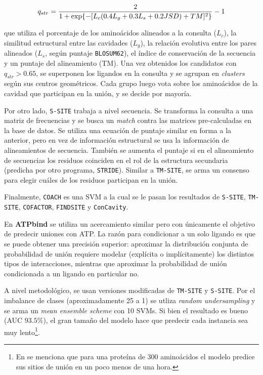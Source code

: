 \documentclass[
    left=2.0cm,         %
    right=2.0cm,        %
    top=2.0cm,          %
    bottom=2.5cm,         %
    bindingoffset=6mm,  %
    nohyphenation=false %
]{eiti/eiti-thesis}
\begin{document}
\begin{equation*}
    \LARGE 
    q_{str} = \frac{2}{1+\exp\{-[L_c(0.4L_g+0.3L_s+0.2JSD)+TM]^2\}} - 1
\end{equation*}

que utiliza el porcentaje de los aminoácidos alineados a la consulta ($L_c$),
la similitud estructural entre las cavidades ($L_g$), la relación evolutiva entre
los pares alineados ($L_s$, según puntaje \texttt{BLOSUM62}), el índice de conservación
de la secuencia y un puntaje del alineamiento (TM). Una vez obtenidos los candidatos
con $q_{str} > 0.65$, se superponen los ligandos en la consulta y se agrupan en
\textit{clusters} según sus centros geométricos. Cada grupo luego vota sobre los
aminoácidos de la cavidad que participan en la unión, y se decide por mayoría.

Por otro lado, \texttt{S-SITE} trabaja a nivel secuencia. Se transforma la consulta
a una matriz de frecuencias y se busca un \textit{match} contra las matrices pre-calculadas
en la base de datos. Se utiliza una ecuación de puntaje similar en forma a la anterior,
pero en vez de información estructural se usa la información de alineamientos de secuencia.
También se aumenta el puntaje si en el alineamiento de secuencias los residuos coinciden
en el rol de la estructura secundaria (predicha por otro programa, \texttt{STRIDE}). Similar
a \texttt{TM-SITE}, se arma un consenso para elegir cuáles de los residuos participan
en la unión.

Finalmente, \texttt{COACH} es una SVM a la cual se le pasan los resultados de \texttt{S-SITE},
\texttt{TM-SITE}, \texttt{COFACTOR}, \texttt{FINDSITE} y \texttt{ConCavity}.

En \textbf{ATPbind}\cite{atpbind} se utiliza un acercamiento similar pero con únicamente el objetivo de
predecir uniones con ATP. La razón para condicionar a un solo ligando es que se puede
obtener una precisión superior: aproximar la distribución conjunta de probabilidad de unión
requiere modelar (explícita o implícitamente) los distintos tipos de interacciones, mientras
que aproximar la probabilidad de unión condicionada a un ligando en particular no.

A nivel metodológico, se usan versiones modificadas de
\texttt{TM-SITE} y \texttt{S-SITE}. Por el imbalance de clases (aproximadamente 25 a 1)
se utliza \textit{random undersampling} y se arma un \textit{mean ensemble scheme} con
10 SVMs. Si bien el resultado es bueno (AUC $93.5\%$), el gran tamaño del modelo hace
que predecir cada instancia sea muy lento\footnote{En \cite{atpbind} se menciona
que para una proteína de 300 aminoácidos el modelo predice sus sitios de unión
en un poco menos de una hora.}.
\end{document}
